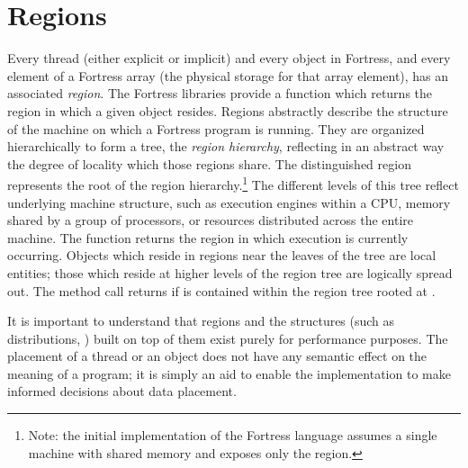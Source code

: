 %
%
%
%

\section{Regions}

Every thread (either explicit or implicit) and every object in Fortress,
and every element of a Fortress array (the physical storage for that array
element), has an associated \emph{region}.
The Fortress libraries provide a function 
which returns the region in which a given object resides.
Regions abstractly describe the structure of
the machine on which a Fortress program is running.  They are
organized hierarchically to form a tree, the \emph{region hierarchy},
reflecting in an abstract way the degree of locality which those
regions share.  The distinguished region  represents the root
of the region hierarchy.\footnote{Note: the initial implementation of the Fortress language assumes a single machine with shared memory and exposes only the  region.}
The different levels of this tree reflect underlying
machine structure, such as execution engines within a CPU, memory
shared by a group of processors, or resources distributed across the
entire machine.  The function  returns the region in which execution is currently occurring.  Objects which reside in regions near the leaves of
the tree are local entities; those which reside at higher levels of
the region tree are logically spread out.
The method call
 returns  if  is contained
within the region tree rooted at .

It is important to understand that regions and the structures
(such as distributions, )
 built on top of them exist
purely for performance purposes.  The placement of a thread or an
object does not have any semantic effect on the meaning of a program;
it is simply an aid to enable the implementation to make informed
decisions about data placement.

